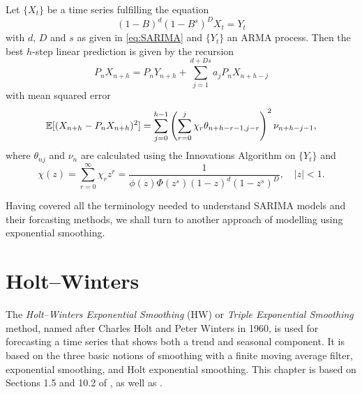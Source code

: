 \documentclass[a4paper, oneside]{discothesis}
\begin{document}
\begin{theorem}
    Let $\{X_t\}$ be a time series fulfilling the equation
    \begin{equation*}
        (1-B)^d (1-B^s)^D X_t = Y_t
    \end{equation*}
    with $d$, $D$ and $s$ as given in \eqref{eq:SARIMA} and $\{Y_t\}$ an ARMA process. Then the best $h$-step linear prediction is given by the recursion
    \begin{equation*}
        P_n X_{n+h} = P_n Y_{n+h} + \sum_{j=1}^{d + Ds} a_j P_n X_{n+h-j}
    \end{equation*}
    with mean squared error
    \begin{equation*}
        \operatorname{\mathbb{E}}[(X_{n+h} - P_nX_{n+h})^2] = \sum_{j=0}^{h-1} \left(\sum_{r=0}^j \chi_r \theta_{n+h-r-1, j-r}\right)^2 \nu_{n+h-j-1},
    \end{equation*}
    where $\theta_{nj}$ and $\nu_n$ are calculated using the Innovations Algorithm on $\{Y_t\}$ and
    \begin{equation*}
        \chi(z) = \sum_{r=0}^\infty \chi_r z^r = \frac{1}{\phi(z)\Phi(z^s)(1-z)^d(1-z^s)^D}, \quad |z| < 1.
    \end{equation*}
\end{theorem}

Having covered all the terminology needed to understand SARIMA models and their forcasting methods, we shall turn to another approach of modelling using exponential smoothing.


\chapter{Holt--Winters}
The \textit{Holt--Winters Exponential Smoothing} (HW) or \textit{Triple Exponential Smoothing} method, named after Charles Holt and Peter Winters in 1960, is used for forecasting a time series that shows both a trend and seasonal component. It is based on the three basic notions of smoothing with a finite moving average filter, exponential smoothing, and Holt exponential smoothing. This chapter is based on Sections 1.5 and 10.2 of \cite{itsf}, as well as \cite{little_ts}.
\end{document}
